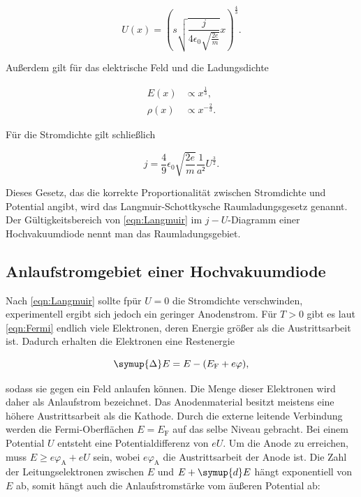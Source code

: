 \begin{equation*}
U(x) = \left(s\sqrt{\frac{j}{4\epsilon_0\sqrt{\frac{2e}{m}}}}x\right)^{\frac{4}{3}}.
\end{equation*}

Außerdem gilt für das elektrische Feld und die Ladungsdichte 

\begin{align*}
E(x) &\propto x^{\frac{1}{3}},\\
\rho(x) &\propto x^{-\frac{2}{3}}.
\end{align*}

Für die Stromdichte gilt schließlich 

\begin{equation}
j = \frac{4}{9}\epsilon_0 \sqrt{\frac{2e}{m}} \frac{1}{a²} U^{\frac{3}{2}}.
\label{eqn:Langmuir}
\end{equation}

Dieses Gesetz, das die korrekte Proportionalität zwischen Stromdichte und 
Potential angibt, wird das Langmuir-Schottkysche Raumladungsgesetz genannt. 
Der Gültigkeitsbereich von \eqref{eqn:Langmuir} im $j-U$-Diagramm einer 
Hochvakuumdiode nennt man das Raumladungsgebiet. 

\subsection{Anlaufstromgebiet einer Hochvakuumdiode}

Nach \eqref{eqn:Langmuir} sollte fpür $U=0$ die Stromdichte verschwinden, 
experimentell ergibt sich jedoch ein geringer Anodenstrom. Für $T > 0$ gibt 
es laut \eqref{eqn:Fermi} endlich viele Elektronen, deren Energie größer
als die Austrittsarbeit ist. Dadurch erhalten die Elektronen eine Restenergie

\begin{equation*}
\symup{\Delta} E = E-(E_\text{F}+e\varphi),
\end{equation*}

sodass sie gegen ein Feld anlaufen können. Die Menge dieser Elektronen wird
daher als Anlaufstrom bezeichnet. Das Anodenmaterial besitzt meistens eine höhere
Austrittsarbeit als die Kathode. Durch die externe leitende Verbindung werden 
die Fermi-Oberflächen $E=E_\text{F}$ auf das selbe Niveau gebracht. Bei einem 
Potential $U$ entsteht eine Potentialdifferenz von $eU$. Um die Anode zu erreichen,
muss $E \geq e\varphi_\text{A}+eU$ sein, wobei $e\varphi_\text{A}$ die Austrittsarbeit
der Anode ist. Die Zahl der Leitungselektronen zwischen $E$ und $E+\symup{d}E$ hängt
exponentiell von $E$ ab, somit hängt auch die Anlaufstromstärke vom äußeren 
Potential ab: 

